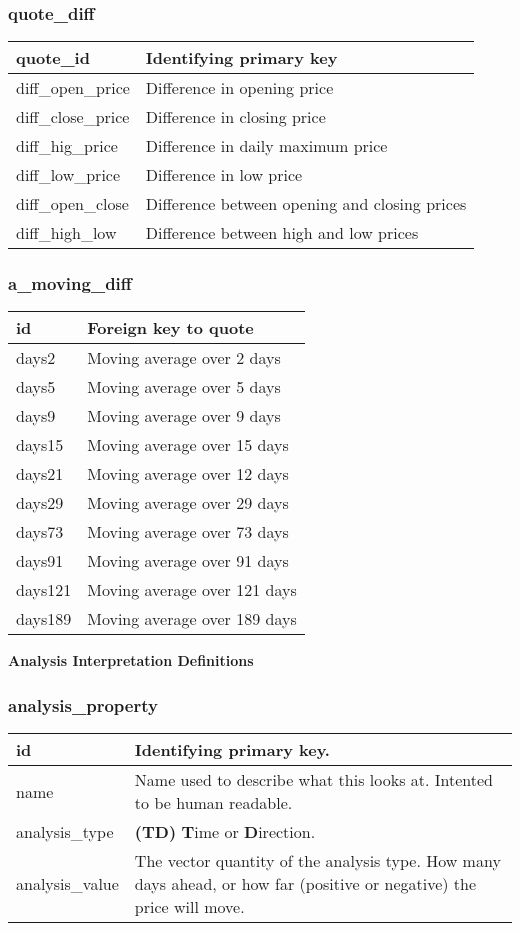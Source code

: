 \subsubsection{quote\_diff}
\begin{tabular}{|l||l|}
	\hline
	quote\_id 				& Identifying primary key \\ \hline
	diff\_open\_price		& Difference in opening price \\ \hline
	diff\_close\_price		& Difference in closing price \\ \hline
	diff\_hig\_price		& Difference in daily maximum price \\ \hline
	diff\_low\_price		& Difference in low price \\ \hline
	diff\_open\_close		& Difference between opening and closing prices\\ \hline
	diff\_high\_low			& Difference between high and low prices\\ \hline
\end{tabular}
\subsubsection{a\_moving\_diff}
\begin{tabular}{|l||l|}
	\hline
	id 				& Foreign key to quote \\ \hline
	days2			& Moving average over 2 days \\ \hline
	days5			& Moving average over 5 days \\ \hline
	days9			& Moving average over 9 days \\ \hline
	days15			& Moving average over 15 days \\ \hline
	days21			& Moving average over 12 days \\ \hline
	days29			& Moving average over 29 days \\ \hline
	days73			& Moving average over 73 days \\ \hline
	days91			& Moving average over 91 days \\ \hline
	days121			& Moving average over 121 days \\ \hline
	days189			& Moving average over 189 days \\ \hline
\end{tabular}

\par \textbf{Analysis Interpretation Definitions}
\subsubsection{analysis\_property}
\begin{tabular}{ |l||l| }
	\hline
	id 					& Identifying primary key. \\ \hline
	name 				& Name used to describe what this looks at. Intented to be human readable. \\ \hline
	analysis\_type 		& \textbf{(T\textbar D)} \textbf{T}ime or \textbf{D}irection. \\ \hline
	analysis\_value 	& The vector quantity of the analysis type. How many days ahead, or how far (positive or negative) the price will move. \\ \hline

\end{tabular}
